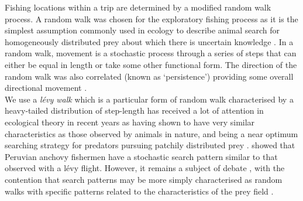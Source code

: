 \documentclass[review]{elsarticle}
\begin{document}
Fishing locations within a trip are  determined by a
modified random walk process.  A random walk was chosen for the exploratory fishing
process as it is the simplest assumption commonly used in ecology to describe
 animal
search for 
homogeneously distributed prey about which there is uncertain knowledge
\citep{Viswanathan1999}. In a random walk, movement is a stochastic process
through a series of steps that can either be equal in length or take some other
functional form. The direction of the random walk was also correlated (known as
`persistence') providing some overall directional
movement \citep{Codling2008} . \\

We use a \textit{ {lévy walk}} which is a
particular form of random walk characterised by a heavy-tailed distribution of
step-length has received a lot of
attention in ecological theory in recent years as having shown to have very
similar characteristics as those observed by animals in nature, and being a
near optimum searching strategy for predators pursuing patchily distributed
prey \citep{Viswanathan1999, Bartumeus2005, Sims2008}.  \citet{Bertrand2007}
showed that Peruvian anchovy fishermen have a stochastic search pattern similar
to that observed with a lévy flight. However, it remains a subject of debate
, with the
contention that search patterns may be more simply characterised as random
walks \citep{Sakiyama2013} with specific patterns related to the
characteristics of the prey field \citep{Sims2012}. \\
\end{document}
